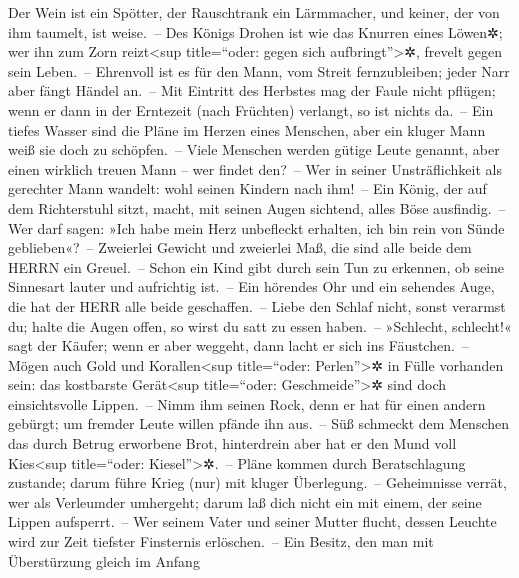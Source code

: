 Der Wein ist ein Spötter, der Rauschtrank ein Lärmmacher,
und keiner, der von ihm taumelt, ist weise.~-- Des Königs
Drohen ist wie das Knurren eines Löwen✲; wer ihn zum Zorn
reizt\textless sup title=``oder: gegen sich aufbringt''\textgreater✲,
frevelt gegen sein Leben.~-- Ehrenvoll ist es für den
Mann, vom Streit fernzubleiben; jeder Narr aber fängt Händel an.~--
Mit Eintritt des Herbstes mag der Faule nicht pflügen;
wenn er dann in der Erntezeit (nach Früchten) verlangt, so ist nichts
da.~-- Ein tiefes Wasser sind die Pläne im Herzen eines
Menschen, aber ein kluger Mann weiß sie doch zu schöpfen.~--
Viele Menschen werden gütige Leute genannt, aber einen
wirklich treuen Mann -- wer findet den?~-- Wer in seiner
Unsträflichkeit als gerechter Mann wandelt: wohl seinen Kindern nach
ihm!~-- Ein König, der auf dem Richterstuhl sitzt, macht,
mit seinen Augen sichtend, alles Böse ausfindig.~-- Wer
darf sagen: »Ich habe mein Herz unbefleckt erhalten, ich bin rein von
Sünde geblieben«?~-- Zweierlei Gewicht und zweierlei Maß,
die sind alle beide dem HERRN ein Greuel.~-- Schon ein
Kind gibt durch sein Tun zu erkennen, ob seine Sinnesart lauter und
aufrichtig ist.~-- Ein hörendes Ohr und ein sehendes
Auge, die hat der HERR alle beide geschaffen.~-- Liebe
den Schlaf nicht, sonst verarmst du; halte die Augen offen, so wirst du
satt zu essen haben.~-- »Schlecht, schlecht!« sagt der
Käufer; wenn er aber weggeht, dann lacht er sich ins Fäustchen.~--
Mögen auch Gold und Korallen\textless sup title=``oder:
Perlen''\textgreater✲ in Fülle vorhanden sein: das kostbarste
Gerät\textless sup title=``oder: Geschmeide''\textgreater✲ sind doch
einsichtsvolle Lippen.~-- Nimm ihm seinen Rock, denn er
hat für einen andern gebürgt; um fremder Leute willen pfände ihn aus.~--
Süß schmeckt dem Menschen das durch Betrug erworbene
Brot, hinterdrein aber hat er den Mund voll Kies\textless sup
title=``oder: Kiesel''\textgreater✲.~-- Pläne kommen
durch Beratschlagung zustande; darum führe Krieg (nur) mit kluger
Überlegung.~-- Geheimnisse verrät, wer als Verleumder
umhergeht; darum laß dich nicht ein mit einem, der seine Lippen
aufsperrt.~-- Wer seinem Vater und seiner Mutter flucht,
dessen Leuchte wird zur Zeit tiefster Finsternis erlöschen.~--
Ein Besitz, den man mit Überstürzung gleich im Anfang
